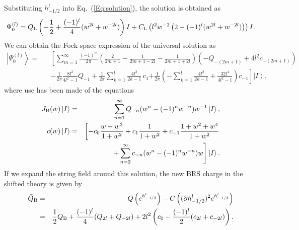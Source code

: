 \documentclass[a4paper,seceq,preprint]{ptptex}
\newcommand{\nn}{\nonumber\\}
\newcommand{\ket}[1]{\left| #1 \right>}
\newcommand{\rL}{{\rm L}}
\newcommand{\Q}{Q_{\rm B}}
\begin{document}
Substituting $h_{-1/2}^l$ into Eq.~(\ref{Eq:solution}), the solution is
obtained as 
\begin{eqnarray}
 \Psi_0^{(l)} = Q_\rL\left(-\frac{1}{2}+\frac{(-1)^l}4
      (w^{2l}+w^{-2l})\right)I
+C_\rL\left(l^2 w^{-2}
 \left(2-(-1)^l(w^{2l}+w^{-2l})\right) \right)I.
\end{eqnarray}
We can obtain the Fock space expression of the
universal solution as
\begin{eqnarray}
\ket{\Psi_0^{(l)}} =&&
\left[ \sum_{m=1}^\infty \frac{(-1)^m}{2\pi}
 \left(\frac{2}{2m+1}-\frac{1}{2m+1-2l}-\frac{1}{2m+1+2l}\right)
   (-Q_{-(2m+1)}+4l^2 c_{-(2m+1)})\right. \nn
&&
-\frac{1}{2\pi}\frac{8l^2}{4l^2-1} Q_{-1}
+\frac{1}{2\pi} \sum_{k=1}^l \frac{4l^2}{2k-1}\,c_1
\left.
+\frac{1}{2\pi}\left(
- \sum_{k=1}^l \frac{4l^2}{2k-1}+\frac{32l^4}{4l^2-1}
\right)c_{-1}\right] \ket{I},
\end{eqnarray}
where use has been made of the equations\cite{rf:TT2}
\begin{eqnarray}
 J_{\rm B}(w)\ket{I} &=&
  \sum_{n=1}^\infty Q_{-n}(w^n-(-1)^n w^{-n})w^{-1} \ket{I}, \nn
 c(w)\ket{I} &=& \left[
 -c_0 \frac{w-w^3}{1+w^2}+c_1 \frac{1}{1+w^2} 
 +c_{-1}\frac{1+w^2+w^4}{1+w^2}\right. \nn
&&
\left.
 +\sum_{n=2}^\infty c_{-n}(w^n-(-1)^n w^{-n})w
\right] \ket{I}.
\end{eqnarray}
If we expand the string field around this solution, the new BRS charge in
the shifted theory is given by
\begin{eqnarray}
 \tilde{Q}_{\rm B} &=& Q\left(
e^{h^l_{-1/2}}\right)
-C\left((\partial h^l_{-1/2})^2e^{h^l_{-1/2}}
\right) \\
&=&
\frac{1}{2}\Q +\frac{(-1)^l}{4}(Q_{2l}+Q_{-2l})
+2l^2 \left(c_0 -\frac{(-1)^l}{2}(c_{2l}+c_{-2l})\right).
\end{eqnarray}
\end{document}
